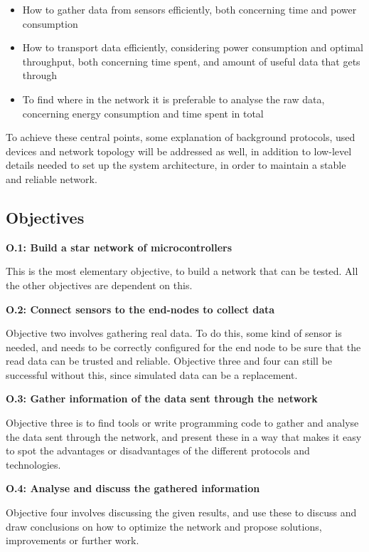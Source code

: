 \begin{itemize}
	\item How to gather data from sensors efficiently, both concerning time and power consumption
	\item How to transport data efficiently, considering power consumption and optimal throughput, both concerning time spent, and amount of useful data that gets through
	\item To find where in the network it is preferable to analyse the raw data, concerning energy consumption and time spent in total
\end{itemize}

\noindent To achieve these central points, some explanation of background protocols, used devices and network topology will be addressed as well, in addition to low-level details needed to set up the system architecture, in order to maintain a stable and reliable network. 


\subsection{Objectives}

\noindent \textbf{O.1: Build a star network of \glspl{microcontroller}}

\noindent This is the most elementary objective, to build a network that can be tested. All the other objectives are dependent on this.  

\noindent\textbf{O.2: Connect sensors to the end-nodes to collect data}

\noindent Objective two involves gathering real data. To do this, some kind of sensor is needed, and needs to be correctly configured for the end node to be sure that the read data can be trusted and reliable. Objective three and four can still be successful without this, since simulated data can be a replacement.  

\noindent\textbf{O.3: Gather information of the data sent through the network}

\noindent Objective three is to find tools or write programming code to gather and analyse the data sent through the network, and present these in a way that makes it easy to spot the advantages or disadvantages of the different protocols and technologies. 

\newpage
\noindent\textbf{O.4: Analyse and discuss the gathered information}

\noindent Objective four involves discussing the given results, and use these to discuss and draw conclusions on how to optimize the network and propose solutions, improvements or further work. 

